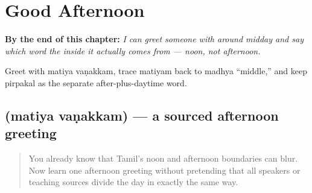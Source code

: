 
\chapter{Good Afternoon}
\label{ch:ta-good-afternoon}

\begin{chapteropening}
\textbf{By the end of this chapter:} \emph{I can greet someone with   around midday and say which word the  inside it actually comes from — noon, not afternoon.}

Greet with matiya vaṇakkam, trace matiyam back to madhya \textquotedblleft{}middle,\textquotedblright{} and keep pirpakal as the separate after-plus-daytime word.
\end{chapteropening}

\section[\texorpdfstring{\ta{மதிய} \ta{வணக்கம்} (matiya vaṇakkam)}{மதிய வணக்கம் (matiya vaṇakkam)}]{  (matiya vaṇakkam) — a sourced afternoon greeting}

\label{lesson:TA-C31-matiya-vanakkam}



\begin{quote}
You already know that Tamil's noon and afternoon boundaries can blur. Now learn one afternoon greeting without pretending that all speakers or teaching sources divide the day in exactly the same way.
\end{quote}

